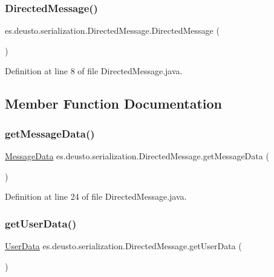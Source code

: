\subsubsection{\texorpdfstring{DirectedMessage()}{DirectedMessage()}}
{\footnotesize\ttfamily es.\+deusto.\+serialization.\+Directed\+Message.\+Directed\+Message (\begin{DoxyParamCaption}{ }\end{DoxyParamCaption})}



Definition at line 8 of file Directed\+Message.\+java.



\subsection{Member Function Documentation}
\mbox{\label{classes_1_1deusto_1_1serialization_1_1_directed_message_a1090d3ffcdb0d012ab443b87fcdfff8b}} 
\subsubsection{\texorpdfstring{getMessageData()}{getMessageData()}}
{\footnotesize\ttfamily \mbox{\hyperlink{classes_1_1deusto_1_1serialization_1_1_message_data}{Message\+Data}} es.\+deusto.\+serialization.\+Directed\+Message.\+get\+Message\+Data (\begin{DoxyParamCaption}{ }\end{DoxyParamCaption})}



Definition at line 24 of file Directed\+Message.\+java.

\mbox{\label{classes_1_1deusto_1_1serialization_1_1_directed_message_a66353c1aa604944db42e4bc569141782}} 
\subsubsection{\texorpdfstring{getUserData()}{getUserData()}}
{\footnotesize\ttfamily \mbox{\hyperlink{classes_1_1deusto_1_1serialization_1_1_user_data}{User\+Data}} es.\+deusto.\+serialization.\+Directed\+Message.\+get\+User\+Data (\begin{DoxyParamCaption}{ }\end{DoxyParamCaption})}



